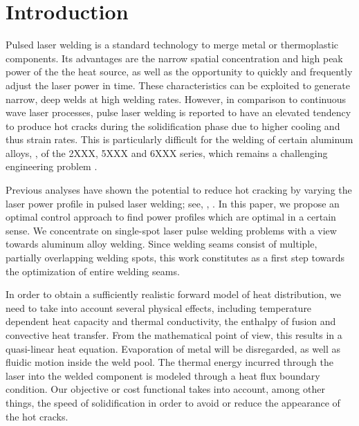 
\section{Introduction}
\label{sec:introduction}

Pulsed laser welding is a standard technology to merge metal or thermoplastic components.
Its advantages are the narrow spatial concentration and high peak power of the the heat source, as well as the opportunity to quickly and frequently adjust the laser power in time.
These characteristics can be exploited to generate narrow, deep welds at high welding rates.
However, in comparison to continuous wave laser processes, pulse laser welding is reported to have an elevated tendency to produce hot cracks during the solidification phase due to higher cooling and thus strain rates.
This is particularly difficult for the welding of certain aluminum alloys, \eg, of the 2XXX, 5XXX and 6XXX series, which remains a challenging engineering problem \cite{Katayama:2001:1,ZhangWeckmanZhou:2008:1,BieleninBergmann:2017:1}.

Previous analyses have shown the potential to reduce hot cracking by varying the laser power profile in pulsed laser welding; see, \eg, \cite{BieleninBergmann:2017:1,JiaZhangYuShiLiuWuYeWangTian:2021:1}.
In this paper, we propose an optimal control approach to find power profiles which are optimal in a certain sense.
We concentrate on single-spot laser pulse welding problems with a view towards aluminum alloy welding.
Since welding seams consist of multiple, partially overlapping welding spots, this work constitutes as a first step towards the optimization of entire welding seams.

In order to obtain a sufficiently realistic forward model of heat distribution, we need to take into account several physical effects, including temperature dependent heat capacity and thermal conductivity, the enthalpy of fusion and convective heat transfer.
From the mathematical point of view, this results in a quasi-linear heat equation.
Evaporation of metal will be disregarded, as well as fluidic motion inside the weld pool.
The thermal energy incurred through the laser into the welded component is modeled through a heat flux boundary condition.
Our objective or cost functional takes into account, among other things, the speed of solidification in order to avoid or reduce the appearance of the hot cracks.

